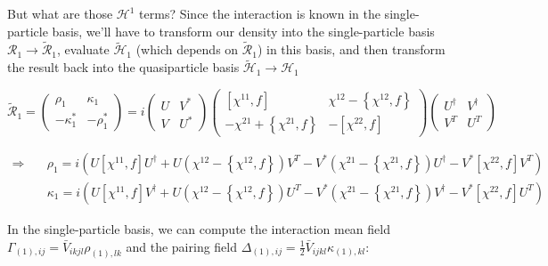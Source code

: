 \noindent But what are those $\mathcal{H}^{1}$ terms? Since the interaction is known in the single-particle basis, we'll have to transform our density into the single-particle basis $\mathcal{R}_1\rightarrow\mathcal{\tilde{R}}_1$, evaluate $\mathcal{\tilde{H}}_1$ (which depends on $\mathcal{\tilde{R}}_1$) in this basis, and then transform the result back into the quasiparticle basis $\mathcal{\tilde{H}}_1\rightarrow\mathcal{H}_1$

\begin{equation*}
\mathcal{\tilde{R}}_1 = \left(\begin{array}{cc}
\rho_1 & \kappa_1 \\
-\kappa_1^* & -\rho_1^*
\end{array}\right) = 
i\left(\begin{array}{cc}
U & V^* \\
V & U^*
\end{array}\right)
\left(\begin{array}{cc}
[\chi^{11},f] & \chi^{12}-\left\{\chi^{12},f\right\} \\
-\chi^{21}+\left\{\chi^{21},f\right\} & -[\chi^{22},f]
\end{array}\right)
\left(\begin{array}{cc}
U^\dagger & V^\dagger \\
V^T & U^T
\end{array}\right)
\end{equation*}

\begin{align*}
\Rightarrow \quad
& \rho_1 = i\left(U[\chi^{11},f]U^\dagger + U\left(\chi^{12}-\left\{\chi^{12},f\right\}\right)V^T - V^*\left(\chi^{21}-\left\{\chi^{21},f\right\}\right)U^\dagger - V^*[\chi^{22},f]V^T \right) \\
& \kappa_1 = i\left(U[\chi^{11},f]V^\dagger + U\left(\chi^{12}-\left\{\chi^{12},f\right\}\right)U^T - V^*\left(\chi^{21}-\left\{\chi^{21},f\right\}\right)V^\dagger - V^*[\chi^{22},f]U^T \right)
\end{align*}

In the single-particle basis, we can compute the interaction mean field $\Gamma_{(1),ij} = \bar{V}_{ikjl}\rho_{(1),lk}$ and the pairing field $\Delta_{(1),ij} = \frac{1}{2}\bar{V}_{ijkl}\kappa_{(1),kl}$:

